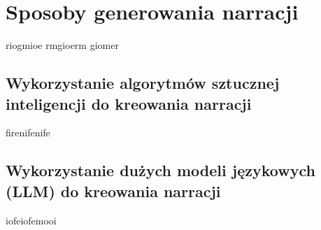 \chapter{Sposoby generowania narracji}\label{chapter:ch2}

riogmioe rmgioerm giomer

\section{Wykorzystanie algorytmów sztucznej inteligencji do kreowania narracji}\label{section:ch2_1}

firenifenife

\section{Wykorzystanie dużych modeli językowych (LLM) do kreowania narracji}\label{section:ch2_2}

iofeiofemooi